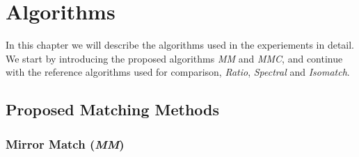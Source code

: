 \chapter{Algorithms}
\label{C:algorithms}

In this chapter we will describe the algorithms used in the experiements
in detail. We start by introducing the proposed algorithms \emph{MM} and 
\emph{MMC}, and continue with the reference algorithms used for 
comparison, \emph{Ratio}, \emph{Spectral} and \emph{Isomatch}.

\section{Proposed Matching Methods}
\label{S:MatchingMethods}

\subsection{Mirror Match (\emph{MM})}

